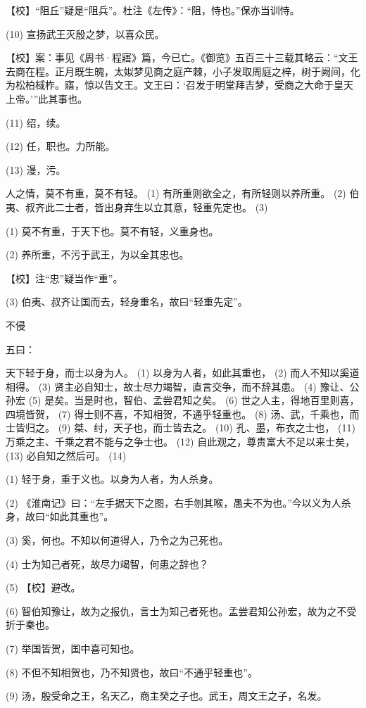 \documentclass[12pt,UTF8]{ctexbook}
\begin{document}
【校】“阻丘”疑是“阻兵”。杜注《左传》：“阻，恃也。”保亦当训恃。

(10) 宣扬武王灭殷之梦，以喜众民。

【校】案：事见《周书·程寤》篇，今已亡。《御览》五百三十三载其略云：“文王去商在程。正月既生魄，太姒梦见商之庭产棘，小子发取周庭之梓，树于阙间，化为松柏棫柞。寤，惊以告文王。文王曰：‘召发于明堂拜吉梦，受商之大命于皇天上帝。’”此其事也。

(11) 绍，续。

(12) 任，职也。力所能。

(13) 漫，污。

人之情，莫不有重，莫不有轻。 (1) 有所重则欲全之，有所轻则以养所重。 (2) 伯夷、叔齐此二士者，皆出身弃生以立其意，轻重先定也。 (3)

(1) 莫不有重，于天下也。莫不有轻，义重身也。

(2) 养所重，不污于武王，为以全其忠也。

【校】注“忠”疑当作“重”。

(3) 伯夷、叔齐让国而去，轻身重名，故曰“轻重先定”。





不侵


五曰：

天下轻于身，而士以身为人。 (1) 以身为人者，如此其重也， (2) 而人不知以奚道相得。 (3) 贤主必自知士，故士尽力竭智，直言交争，而不辞其患。 (4) 豫让、公孙宏 (5) 是矣。当是时也，智伯、孟尝君知之矣。 (6) 世之人主，得地百里则喜，四境皆贺， (7) 得士则不喜，不知相贺，不通乎轻重也。 (8) 汤、武，千乘也，而士皆归之。 (9) 桀、纣，天子也，而士皆去之。 (10) 孔、墨，布衣之士也， (11) 万乘之主、千乘之君不能与之争士也。 (12) 自此观之，尊贵富大不足以来士矣， (13) 必自知之然后可。 (14)

(1) 轻于身，重于义也。以身为人者，为人杀身。

(2) 《淮南记》曰：“左手据天下之图，右手刎其喉，愚夫不为也。”今以义为人杀身，故曰“如此其重也”。

(3) 奚，何也。不知以何道得人，乃令之为己死也。

(4) 士为知己者死，故尽力竭智，何患之辞也？

(5) 【校】避改。

(6) 智伯知豫让，故为之报仇，言士为知己者死也。孟尝君知公孙宏，故为之不受折于秦也。

(7) 举国皆贺，国中喜可知也。

(8) 不但不知相贺也，乃不知贤也，故曰“不通乎轻重也”。

(9) 汤，殷受命之王，名天乙，商主癸之子也。武王，周文王之子，名发。
\end{document}
